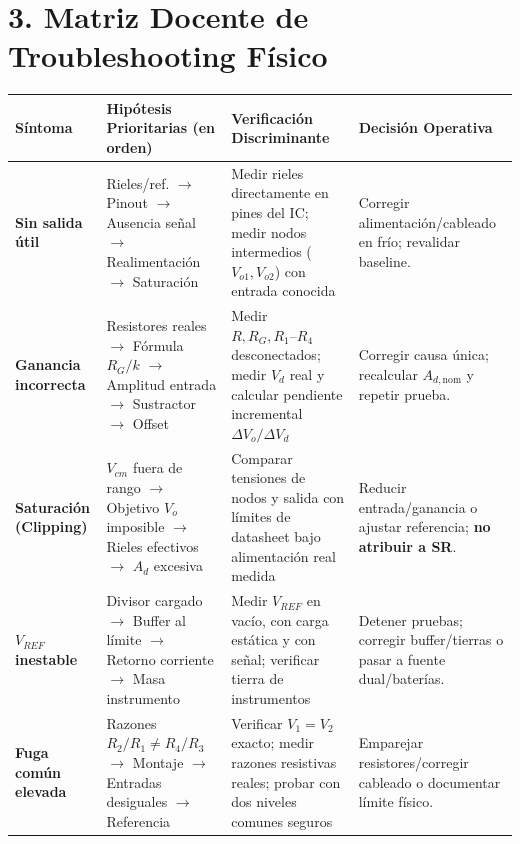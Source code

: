 \documentclass[10pt, a4paper]{article}
\begin{document}
\section*{3. Matriz Docente de Troubleshooting Físico}
\begin{table}[htbp]
    \centering
    \footnotesize
    \renewcommand{\arraystretch}{1.35}
    \begin{tabularx}{\textwidth}{|>{\raggedright\arraybackslash}p{2.5cm}|>{\raggedright\arraybackslash}p{4.3cm}|>{\raggedright\arraybackslash}X|>{\raggedright\arraybackslash}p{3.8cm}|}
    \hline
    \rowcolor[HTML]{EFEFEF} 
    \textbf{Síntoma} & \textbf{Hipótesis Prioritarias (en orden)} & \textbf{Verificación Discriminante} & \textbf{Decisión Operativa} \\ \hline
    \textbf{Sin salida útil} & Rieles/ref. $\rightarrow$ Pinout $\rightarrow$ Ausencia señal $\rightarrow$ Realimentación $\rightarrow$ Saturación & Medir rieles directamente en pines del IC; medir nodos intermedios ($V_{o1}, V_{o2}$) con entrada conocida & Corregir alimentación/cableado en frío; revalidar baseline. \\ \hline
    \textbf{Ganancia incorrecta} & Resistores reales $\rightarrow$ Fórmula $R_G/k$ $\rightarrow$ Amplitud entrada $\rightarrow$ Sustractor $\rightarrow$ Offset & Medir $R, R_G, R_1\text{--}R_4$ desconectados; medir $V_d$ real y calcular pendiente incremental $\Delta V_o/\Delta V_d$ & Corregir causa única; recalcular $A_{d,\mathrm{nom}}$ y repetir prueba. \\ \hline
    \textbf{Saturación (Clipping)} & $V_{cm}$ fuera de rango $\rightarrow$ Objetivo $V_o$ imposible $\rightarrow$ Rieles efectivos $\rightarrow$ $A_d$ excesiva & Comparar tensiones de nodos y salida con límites de datasheet bajo alimentación real medida & Reducir entrada/ganancia o ajustar referencia; \textbf{no atribuir a SR}. \\ \hline
    \textbf{$V_{REF}$ inestable} & Divisor cargado $\rightarrow$ Buffer al límite $\rightarrow$ Retorno corriente $\rightarrow$ Masa instrumento & Medir $V_{REF}$ en vacío, con carga estática y con señal; verificar tierra de instrumentos & Detener pruebas; corregir buffer/tierras o pasar a fuente dual/baterías. \\ \hline
    \textbf{Fuga común elevada} & Razones $R_2/R_1 \neq R_4/R_3$ $\rightarrow$ Montaje $\rightarrow$ Entradas desiguales $\rightarrow$ Referencia & Verificar $V_1=V_2$ exacto; medir razones resistivas reales; probar con dos niveles comunes seguros & Emparejar resistores/corregir cableado o documentar límite físico. \\ \hline

\end{tabularx}
\end{table}
\end{document}
